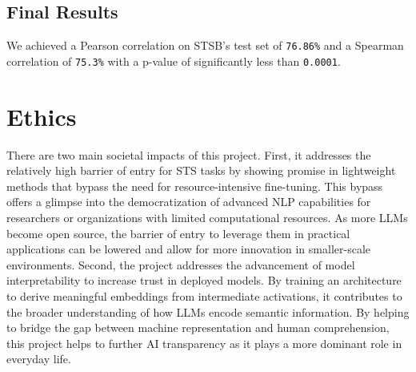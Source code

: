 \documentclass[14pt]{article}
\begin{document}
\subsection{Final Results}
We achieved a Pearson correlation on STSB's test set of \verb|76.86%| and a Spearman correlation of \verb|75.3%| with a p-value of significantly less than \verb|0.0001|.

\section{Ethics}
There are two main societal impacts of this project. First, it addresses the relatively high barrier of entry for STS tasks by showing promise in lightweight methods that bypass the need for resource-intensive fine-tuning. This bypass offers a glimpse into the democratization of advanced NLP capabilities for researchers or organizations with limited computational resources. As more LLMs become open source, the barrier of entry to leverage them in practical applications can be lowered and allow for more innovation in smaller-scale environments. Second, the project addresses the advancement of model interpretability to increase trust in deployed models. By training an architecture to derive meaningful embeddings from intermediate activations, it contributes to the broader understanding of how LLMs encode semantic information. By helping to bridge the gap between machine representation and human comprehension, this project helps to further AI transparency as it plays a more dominant role in everyday life. 
\end{document}
